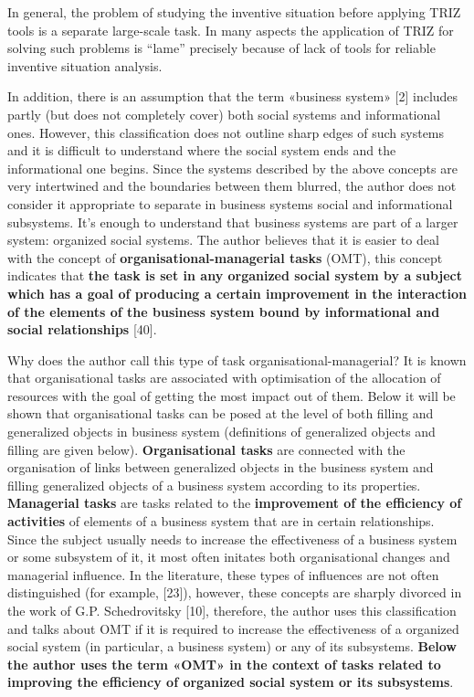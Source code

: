 \documentclass[11pt,a4paper]{book}
\begin{document}
In general, the problem of studying the inventive situation before applying
TRIZ tools is a separate large-scale task. In many aspects the application of
TRIZ for solving such problems is “lame” precisely because of lack of tools
for reliable inventive situation analysis.

In addition, there is an assumption that the term «business system» [2]
includes partly (but does not completely cover) both social systems and
informational ones.  However, this classification does not outline sharp edges
of such systems and it is difficult to understand where the social system ends
and the informational one begins. Since the systems described by the above
concepts are very intertwined and the boundaries between them blurred, the
author does not consider it appropriate to separate in business systems social
and informational subsystems.  It’s enough to understand that business systems
are part of a larger system: organized social systems.  The author believes
that it is easier to deal with the concept of
\textbf{organisational-managerial tasks} (OMT), this concept indicates that
\textbf{the task is set in any organized social system by a subject which has
  a goal of producing a certain improvement in the interaction of the elements
  of the business system bound by informational and social relationships}
       [40].

Why does the author call this type of task organisational-managerial?  It is
known that organisational tasks are associated with optimisation of the
allocation of resources with the goal of getting the most impact out of them.
Below it will be shown that organisational tasks can be posed at the level of
both filling and generalized objects in business system (definitions of
generalized objects and filling are given below). \textbf{Organisational
  tasks} are connected with the organisation of links between generalized
objects in the business system and filling generalized objects of a business
system according to its properties.  \textbf{Managerial tasks} are tasks
related to the \textbf{improvement of the efficiency of activities} of
elements of a business system that are in certain relationships. Since the
subject usually needs to increase the effectiveness of a business system or
some subsystem of it, it most often initates both organisational changes and
managerial influence.  In the literature, these types of influences are not
often distinguished (for example, [23]), however, these concepts are sharply
divorced in the work of G.P. Schedrovitsky [10], therefore, the author uses
this classification and talks about OMT if it is required to increase the
effectiveness of a organized social system (in particular, a business system)
or any of its subsystems. \textbf{Below the author uses the term «OMT» in the
  context of tasks related to improving the efficiency of organized social
  system or its subsystems}.
\end{document}
